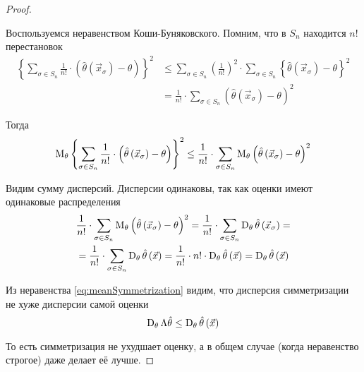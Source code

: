 \begin{proof}
\begin{enumerate}
      Воспользуемся неравенством Коши-Буняковского.
      Помним, что в $S_n$ находится $n!$ перестановок
      \begin{equation*}
        \begin{split}
          \left\{ \sum_{\sigma\in S_n} \frac{1}{n!}
            \cdot \left( \hat{\theta}\left( \vec{x}_{\sigma} \right)
              -\theta \right) \right\}^2
          & \le \sum_{\sigma \in S_n} \left( \frac{1}{n!} \right)^2
            \cdot \sum_{\sigma \in S_n} \left\{
              \hat{\theta}\left( \vec{x}_{\sigma} \right) - \theta \right\}^2 \\
          & = \frac{1}{n!} \cdot \sum_{\sigma\in S_n}
              \left( \hat{\theta}\left( \vec{x}_\sigma \right) -\theta \right)^2
        \end{split}
      \end{equation*}

      Тогда
      \begin{equation}\label{eq:meanSymmetrization}
          \operatorname{M}_{\theta} \left\{\sum_{\sigma\in S_n}\frac{1}{n!}\cdot
        \left(\hat{\theta}\left(\vec{x}_\sigma\right)
        -\theta\right)\right\}^2
        \le \frac{1}{n!} \cdot \sum_{\sigma\in S_n} \operatorname{M}_{\theta} 
            \left( \hat{\theta}\left( \vec{x}_\sigma \right)
            -\theta \right)^2
      \end{equation}

      Видим сумму дисперсий.
      Дисперсии одинаковы, так как оценки имеют одинаковые распределения
      \begin{align*}
        &\frac{1}{n!}\cdot \sum_{\sigma\in S_n}
          \operatorname{M}_{\theta} 
            \left(\hat{\theta}\left(\vec{x}_\sigma\right)
            -\theta\right)^2
        = \frac{1}{n!}\cdot \sum_{\sigma\in S_n}
          \operatorname{D}_{\theta} 
            \hat{\theta}\left(\vec{x}_\sigma\right)= \\
        &= \frac{1}{n!}\cdot \sum_{\sigma\in S_n}
          \operatorname{D}_{\theta} \hat{\theta}\left(\vec{x}\right)
        = \frac{1}{n!}\cdot n!
          \cdot \operatorname{D}_{\theta} \hat{\theta}\left(\vec{x}\right)
        = \operatorname{D}_{\theta} \hat{\theta}\left(\vec{x}\right)
      \end{align*}

      Из неравенства \eqref{eq:meanSymmetrization} видим,
      что дисперсия симметризации не хуже дисперсии самой оценки
      \begin{equation*}
        \operatorname{D}_{\theta} \Lambda\hat{\theta}
          \le \operatorname{D}_{\theta} \hat{\theta}\left({\vec{x}}\right)
      \end{equation*}

  \end{enumerate}

  То есть симметризация не ухудшает оценку,
  а в общем случае (когда неравенство строгое) даже делает её лучше.
\end{proof}


